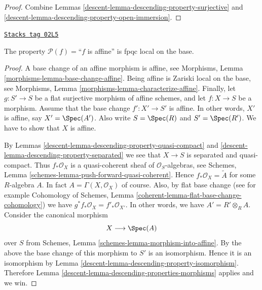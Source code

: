 \begin{proof}

Combine Lemmas \ref{descent-lemma-descending-property-surjective}
and \ref{descent-lemma-descending-property-open-immersion}.
\end{proof}

\begin{lemma}
\label{descent-lemma-descending-property-affine}
\href{https://stacks.math.columbia.edu/tag/02L5}{\texttt{Stacks tag 02L5}}

The property $\mathcal{P}(f) =$``$f$ is affine''
is fpqc local on the base.
\end{lemma}

\begin{proof}

A base change of an affine morphism is affine, see
Morphisms, Lemma \ref{morphisms-lemma-base-change-affine}.
Being affine is Zariski local on the base, see
Morphisms, Lemma \ref{morphisms-lemma-characterize-affine}.
Finally, let
$g : S' \to S$ be a flat surjective morphism of affine schemes,
and let $f : X \to S$ be a morphism. Assume that the base change
$f' : X' \to S'$ is affine. In other words, $X'$ is affine, say
$X' = \Spec(A')$. Also write $S = \Spec(R)$
and $S' = \Spec(R')$. We have to show that $X$ is affine.

\medskip\noindent
By Lemmas \ref{descent-lemma-descending-property-quasi-compact}
and \ref{descent-lemma-descending-property-separated} we see that
$X \to S$ is separated and quasi-compact. Thus
$f_*\mathcal{O}_X$ is a quasi-coherent sheaf of $\mathcal{O}_S$-algebras,
see Schemes, Lemma \ref{schemes-lemma-push-forward-quasi-coherent}.
Hence $f_*\mathcal{O}_X = \widetilde{A}$ for some $R$-algebra $A$.
In fact $A = \Gamma(X, \mathcal{O}_X)$ of course.
Also, by flat base change
(see for example
Cohomology of Schemes, Lemma \ref{coherent-lemma-flat-base-change-cohomology})
we have $g^*f_*\mathcal{O}_X = f'_*\mathcal{O}_{X'}$.
In other words, we have $A' = R' \otimes_R A$.
Consider the canonical morphism
$$
X \longrightarrow \Spec(A)
$$
over $S$ from Schemes, Lemma \ref{schemes-lemma-morphism-into-affine}.
By the above the base change of this morphism to $S'$ is an isomorphism.
Hence it is an isomorphism by
Lemma \ref{descent-lemma-descending-property-isomorphism}.
Therefore Lemma \ref{descent-lemma-descending-properties-morphisms} applies and we win.
\end{proof}

